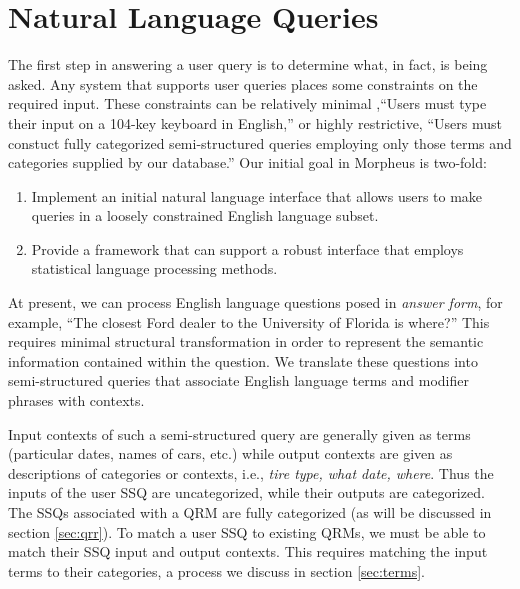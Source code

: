 \section{Natural Language Queries}
The first step in answering a user query is to determine what, in
fact, is being asked.  Any system that supports user queries places
some constraints on the required input.  These constraints can be
relatively minimal ,``Users must type their input on a 104-key
keyboard in English,'' or highly restrictive, ``Users must constuct
fully categorized semi-structured queries employing only those terms and
categories supplied by our database.''  Our initial goal in Morpheus
is two-fold:

\begin{enumerate}
\item Implement an initial natural language interface that allows
  users to make queries in a loosely constrained English language
  subset.
\item Provide a framework that can support a robust
  interface that employs statistical language processing
  methods.  
\end{enumerate}

At present, we can process English language questions posed in
\emph{answer form}, for example, ``The closest Ford dealer to the University
of Florida is where?'' This requires minimal structural transformation in order
to represent the semantic information contained within the question.  We
translate these questions into semi-structured queries that associate
English language terms and modifier phrases with contexts.

Input contexts of such a semi-structured query are generally given as
terms (particular dates, names of cars, etc.) while output contexts
are given as descriptions of categories or contexts, i.e.,
\emph{tire type, what date, where}. Thus the inputs of the
user SSQ are uncategorized, while their outputs are categorized.  The
SSQs associated with a QRM are fully categorized (as will be discussed
in section \ref{sec:qrr}). To match a user SSQ to existing QRMs, we
must be able to match their SSQ input and output contexts.  This
requires matching the input terms to their categories, a process we
discuss in section \ref{sec:terms}.
